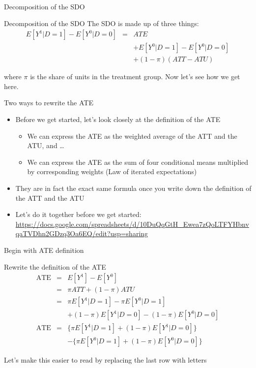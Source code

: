 \documentclass{beamer}
\begin{document}
\begin{frame}{Decomposition of the SDO}

  \begin{block}{Decomposition of the SDO}
    The SDO is made up of three things:
    \begin{eqnarray*}
      E[Y^1 | D=1] - E[Y^0 | D=0]&=& ATE\nonumber \\
      &&+ E[Y^0|D=1] - E[Y^0|D=0] \nonumber \\
      && + (1-\pi)(ATT - ATU)
    \end{eqnarray*}
  \end{block}

\bigskip

where $\pi$ is the share of units in the treatment group.  Now let's see how we get here.
\end{frame}

\begin{frame}{Two ways to rewrite the ATE}

\begin{itemize}
\item Before we get started, let's look closely at the definition of the ATE
	\begin{itemize}
	\item We can express the ATE as the weighted average of the ATT and the ATU, and \dots
	\item We can express the ATE as the sum of four conditional means multiplied by corresponding weights (Law of iterated expectations)
	\end{itemize}
\item They are in fact the exact same formula once you write down the definition of the ATT and the ATU
\item Let's do it together before we get started: \url{https://docs.google.com/spreadsheets/d/10DuQqGtH_Ewea7zQoLTFYHbnvqaTVDhn2GDzq3Oa6EQ/edit?usp=sharing}

\end{itemize}

\end{frame}


\begin{frame}{Begin with ATE definition}

  \begin{block}{Rewrite the definition of the ATE}
    \begin{eqnarray*}
      \text{ATE}&=&E[Y^1]-E[Y^0]  \\
      &=& \pi ATT + (1-\pi) ATU \\
      &=& \pi E[Y^1 | D=1] - \pi E[Y^0 | D=1]  \\
      & & + (1-\pi) E[Y^1|D=0] - (1-\pi) E[Y^0 | D=0] \\
      \text{ATE}&=& \{\pi E[Y^1 | D=1] + (1-\pi)E[Y^1 | D=0]\}  \\
      & & - \{\pi E[Y^0|D=1] + (1-\pi) E[Y^0 | D=0]\}
    \end{eqnarray*}
  \end{block}

\bigskip

Let's make this easier to read by replacing the last row with letters

\end{frame}
\end{document}
